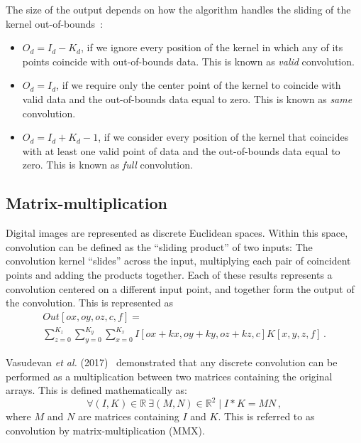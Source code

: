 The size of the output depends on how the algorithm handles the sliding of the kernel out-of-bounds~\cite{alzubaidi2021review}:
\begin{itemize}
\item $O_d = I_d - K_d$, if we ignore every position of the kernel in which any of its points coincide with out-of-bounds data. This is known as \textit{valid} convolution.

\item $O_d = I_d$, if we require only the center point of the kernel to coincide with valid data and the out-of-bounds data equal to zero. This is known as \textit{same} convolution.

\item $O_d = I_d + K_d - 1$, if we consider every position of the kernel that coincides with at least one valid point of data and the out-of-bounds data equal to zero. This is known as \textit{full} convolution.
\end{itemize}

\subsection{Matrix-multiplication}

Digital images are represented as discrete Euclidean spaces. Within this space, convolution can be defined as the ``sliding product'' of two inputs: The convolution kernel ``slides'' across the input, multiplying each pair of coincident points and adding the products together. Each of these results represents a convolution centered on a different input point, and together form the output of the convolution. This is represented as
%
\begin{equation}\label{eq:slide}
\begin{gathered}
  Out[ox,oy,oz,c,f] = \\\sum_{z=0}^{K_z}\sum_{y=0}^{K_y}\sum_{x=0}^{K_x}I[ox+kx,oy+ky,oz+kz,c]K[x,y,z,f]\,.
\end{gathered}
\end{equation}

%

Vasudevan \textit{et al.} (2017)~\cite{vasudevan2017parallel} demonstrated that any discrete convolution can be performed as a multiplication between two matrices containing the original arrays. This is defined mathematically as:
%
\begin{equation}\label{eq:MM}
  \forall (I,K) \in \mathbb{R}~\exists (M,N) \in \mathbb{R}^2 \mid I*K = MN\,,
\end{equation}%
%
where $M$ and $N$ are matrices containing $I$ and $K$. This is referred to as convolution by matrix-multiplication (MMX).

